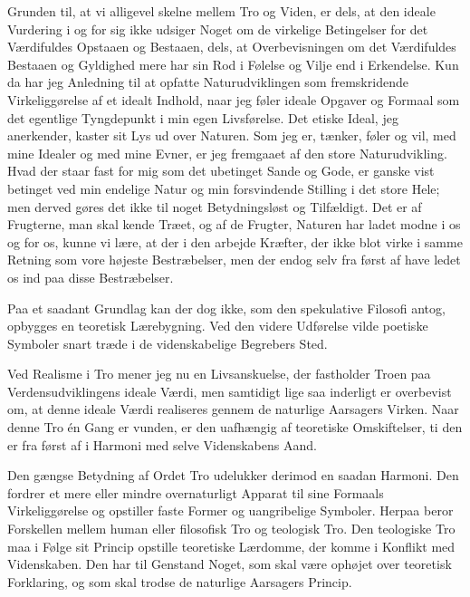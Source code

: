 \documentclass[12pt,a4paper]{article}
\begin{document}
Grunden til, at vi alligevel skelne mellem Tro og Viden, er dels, at
den ideale Vurdering i og for sig ikke udsiger Noget om de virkelige
Betingelser for det Værdifuldes Opstaaen og Bestaaen, dels, at
Overbevisningen om det Værdifuldes Bestaaen og Gyldighed mere har sin
Rod i Følelse og Vilje end i Erkendelse. Kun da har jeg Anledning til
at opfatte Naturudviklingen som fremskridende Virkeliggørelse af et
idealt Indhold, naar jeg føler ideale Opgaver og Formaal som det
egentlige Tyngdepunkt i min egen Livsførelse. Det etiske Ideal, jeg
anerkender, kaster sit Lys ud over Naturen. Som jeg er, tænker, føler
og vil, med mine Idealer og med mine Evner, er jeg fremgaaet af den
store Naturudvikling. Hvad der staar fast for mig som det ubetinget
Sande og Gode, er ganske vist betinget ved min endelige Natur og min
forsvindende Stilling i det store Hele; men derved gøres det ikke til
noget Betydningsløst og Tilfældigt. Det er af Frugterne, man skal kende
Træet, og af de Frugter, Naturen har ladet modne i os og for os, kunne
vi lære, at der i den arbejde Kræfter, der ikke blot virke i samme
Retning som vore højeste Bestræbelser, men der endog selv fra først af
have ledet os ind paa disse Bestræbelser.

Paa et saadant Grundlag kan der dog ikke, som den spekulative Filosofi
antog, opbygges en teoretisk Lærebygning. Ved den videre Udførelse vilde
poetiske Symboler snart træde i de videnskabelige Begrebers Sted.

Ved Realisme i Tro mener jeg nu en Livsanskuelse, der fastholder Troen
paa Verdensudviklingens ideale Værdi, men samtidigt lige saa inderligt
er overbevist om, at denne ideale Værdi realiseres gennem de naturlige
Aarsagers Virken. Naar denne Tro én Gang er vunden, er den uafhængig af
teoretiske Omskiftelser, ti den er fra først af i Harmoni med selve
Videnskabens Aand.

Den gængse Betydning af Ordet Tro udelukker derimod en saadan Harmoni.
Den fordrer et mere eller mindre overnaturligt Apparat til sine Formaals
Virkeliggørelse og opstiller faste Former og uangribelige Symboler.
Herpaa beror Forskellen mellem human eller filosofisk Tro og teologisk
Tro. Den teologiske Tro maa i Følge sit Princip opstille teoretiske
Lærdomme, der komme i Konflikt med Videnskaben. Den har til Genstand
Noget, som skal være ophøjet over teoretisk Forklaring, og som skal
trodse de naturlige Aarsagers Princip.
\end{document}
